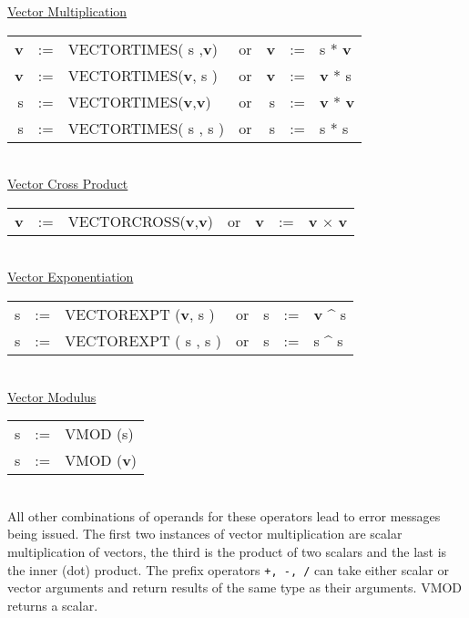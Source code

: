 \underline{Vector Multiplication}\\ 
 
\begin{tabular}{rclcrcl}
{\bf v} &:=& VECTORTIMES(   s   ,{\bf v})  &{\rm or }& {\bf v} &:=&     
s    *  {\bf v} \\
{\bf v} &:=& VECTORTIMES({\bf v},   s   )  &{\rm or }& {\bf v} &:=& {\bf
 v}  *     s    \\
   s    &:=& VECTORTIMES({\bf v},{\bf v})  &{\rm or }&    s    &:=& {\bf
 v}  *  {\bf v} \\
   s    &:=& VECTORTIMES(   s   ,   s   )  &{\rm or }&    s    &:=&     
s    *     s    \\
\end{tabular} \\
 
\underline{Vector Cross Product} \\
  
\begin{tabular}{rclcrcl}
{\bf v} &:=& VECTORCROSS({\bf v},{\bf v})  &{\rm or }& {\bf v} &:=& {\bf
 v} $\times$   {\bf v} \\
\end{tabular} \\
 
\underline{Vector Exponentiation}\\
 
\begin{tabular}{rclcrcl}
   s    &:=& VECTOREXPT ({\bf v},   s   )  &{\rm or }&    s    &:=& {\bf
 v}  \^{} s   \\
   s    &:=& VECTOREXPT (   s   ,   s   )  &{\rm or }&    s    &:=&    s
     \^{} s   \\
\end{tabular} \\

\underline{Vector Modulus}\\
 
\begin{tabular}{rcl}
   s    &:=& VMOD (s)\\
   s    &:=& VMOD ({\bf v}) \\
\end{tabular} \\

All other combinations of operands for these operators lead to error 
messages being issued.  The first two instances of vector
multiplication are scalar multiplication of vectors, the third is the
 
 
product of two scalars and the last is the inner (dot) product.  The
prefix operators  {\tt +, -, /} can take either scalar or vector
arguments and return results of the same type as their arguments. 
VMOD returns a scalar.


